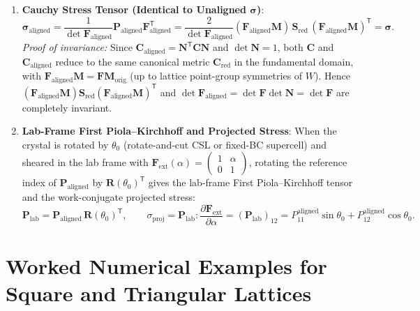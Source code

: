 \documentclass[11pt,a4paper]{article}
\newcommand{\T}{^{\mathsf T}}
\begin{document}
\begin{enumerate}
  \item \textbf{Cauchy Stress Tensor (Identical to Unaligned $\boldsymbol{\sigma}$)}:
  \begin{equation}
    \boxed{
    \boldsymbol{\sigma}_{\text{aligned}}
    = \frac{1}{\det\mathbf{F}_{\text{aligned}}} \mathbf{P}_{\text{aligned}} \mathbf{F}_{\text{aligned}}\T
    = \frac{2}{\det\mathbf{F}_{\text{aligned}}}
      (\mathbf{F}_{\text{aligned}}\mathbf{M})\,\mathbf{S}_{\text{red}}\,(\mathbf{F}_{\text{aligned}}\mathbf{M})\T
    = \boldsymbol{\sigma}.
    }
    \label{eq:cauchy_aligned}
  \end{equation}
  \emph{Proof of invariance:} Since $\mathbf{C}_{\text{aligned}} = \mathbf{N}\T \mathbf{C} \mathbf{N}$ and $\det\mathbf{N} = 1$, both $\mathbf{C}$ and $\mathbf{C}_{\text{aligned}}$ reduce to the same canonical metric $\mathbf{C}_{\text{red}}$ in the fundamental domain, with $\mathbf{F}_{\text{aligned}}\mathbf{M} = \mathbf{F}\mathbf{M}_{\text{orig}}$ (up to lattice point-group symmetries of $W$). Hence $(\mathbf{F}_{\text{aligned}}\mathbf{M})\mathbf{S}_{\text{red}}(\mathbf{F}_{\text{aligned}}\mathbf{M})\T$ and $\det\mathbf{F}_{\text{aligned}} = \det\mathbf{F}\det\mathbf{N} = \det\mathbf{F}$ are completely invariant.

  \item \textbf{Lab-Frame First Piola--Kirchhoff and Projected Stress}:
  When the crystal is rotated by $\theta_0$ (rotate-and-cut CSL or fixed-BC supercell) and sheared in the lab frame with $\mathbf{F}_{\text{ext}}(\alpha) = \begin{pmatrix} 1 & \alpha \\ 0 & 1 \end{pmatrix}$, rotating the reference index of $\mathbf{P}_{\text{aligned}}$ by $\mathbf{R}(\theta_0)\T$ gives the lab-frame First Piola--Kirchhoff tensor and the work-conjugate projected stress:
  \begin{equation}
    \mathbf{P}_{\text{lab}} = \mathbf{P}_{\text{aligned}}\,\mathbf{R}(\theta_0)\T, \qquad
    \boxed{
    \sigma_{\text{proj}} = \mathbf{P}_{\text{lab}} : \frac{\partial \mathbf{F}_{\text{ext}}}{\partial \alpha}
    = (\mathbf{P}_{\text{lab}})_{12}
    = P_{11}^{\text{aligned}}\sin\theta_0 + P_{12}^{\text{aligned}}\cos\theta_0.
    }
  \end{equation}
\end{enumerate}

\section{Worked Numerical Examples for Square and Triangular Lattices}
\end{document}
